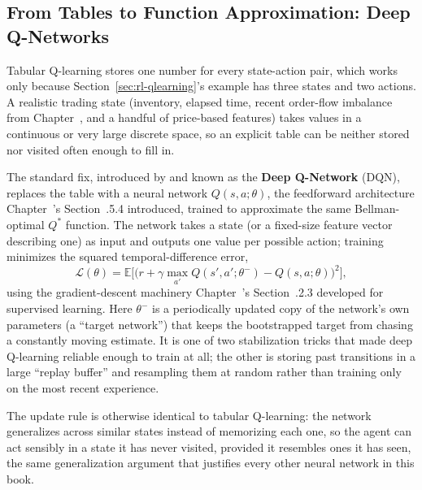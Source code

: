\documentclass[../ai_in_finance]{subfiles}
\begin{document}
\subsection{From Tables to Function Approximation: Deep Q-Networks}
\label{sec:dqn}

Tabular Q-learning stores one number for every state-action pair, which works only because Section~\ref{sec:rl-qlearning}'s example has three states and two actions. A realistic trading state (inventory, elapsed time, recent order-flow imbalance from Chapter~, and a handful of price-based features) takes values in a continuous or very large discrete space, so an explicit table can be neither stored nor visited often enough to fill in.

The standard fix, introduced by \textcite{mnih2015human} and known as the \textbf{Deep Q-Network} (DQN), replaces the table with a neural network $Q(s,a;\theta)$, the feedforward architecture Chapter~'s Section~.5.4 introduced, trained to approximate the same Bellman-optimal $Q^*$ function. The network takes a state (or a fixed-size feature vector describing one) as input and outputs one value per possible action; training minimizes the squared temporal-difference error,
\begin{equation}
\mathcal{L}(\theta) = \mathbb{E}\Big[\big(r + \gamma \max_{a'} Q(s',a';\theta^-) - Q(s,a;\theta)\big)^2\Big],
\label{eq:rl-dqn-loss}
\end{equation}
using the gradient-descent machinery Chapter~'s Section~.2.3 developed for supervised learning. Here $\theta^-$ is a periodically updated copy of the network's own parameters (a ``target network'') that keeps the bootstrapped target from chasing a constantly moving estimate. It is one of two stabilization tricks that made deep Q-learning reliable enough to train at all; the other is storing past transitions in a large ``replay buffer'' and resampling them at random rather than training only on the most recent experience.

The update rule is otherwise identical to tabular Q-learning: the network generalizes across similar states instead of memorizing each one, so the agent can act sensibly in a state it has never visited, provided it resembles ones it has seen, the same generalization argument that justifies every other neural network in this book.
\end{document}
